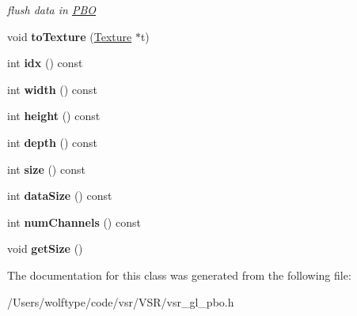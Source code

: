 \begin{DoxyCompactItemize}
\begin{DoxyCompactList}\small\item\em flush data in \hyperlink{classvsr_1_1_p_b_o}{P\-B\-O} \end{DoxyCompactList}\item 
\hypertarget{classvsr_1_1_p_b_o_abd69a277a2d301dcacc6cbb0c0659dec}{void {\bfseries to\-Texture} (\hyperlink{classvsr_1_1_texture}{Texture} $\ast$t)}\label{classvsr_1_1_p_b_o_abd69a277a2d301dcacc6cbb0c0659dec}

\item 
\hypertarget{classvsr_1_1_p_b_o_a6d42f70a135317adb009f9a588bc2adc}{int {\bfseries idx} () const }\label{classvsr_1_1_p_b_o_a6d42f70a135317adb009f9a588bc2adc}

\item 
\hypertarget{classvsr_1_1_p_b_o_a650cee1457e7591445f2acc35f8186e0}{int {\bfseries width} () const }\label{classvsr_1_1_p_b_o_a650cee1457e7591445f2acc35f8186e0}

\item 
\hypertarget{classvsr_1_1_p_b_o_ad3456b46511b43ca9aac8ab6e2a8f13e}{int {\bfseries height} () const }\label{classvsr_1_1_p_b_o_ad3456b46511b43ca9aac8ab6e2a8f13e}

\item 
\hypertarget{classvsr_1_1_p_b_o_a1f108aefbfe0309b219c5929901b83a3}{int {\bfseries depth} () const }\label{classvsr_1_1_p_b_o_a1f108aefbfe0309b219c5929901b83a3}

\item 
\hypertarget{classvsr_1_1_p_b_o_ad8ac523681f02fdf799148d3b9f1fa3a}{int {\bfseries size} () const }\label{classvsr_1_1_p_b_o_ad8ac523681f02fdf799148d3b9f1fa3a}

\item 
\hypertarget{classvsr_1_1_p_b_o_a459138da3ee6be14de775d5999805c9f}{int {\bfseries data\-Size} () const }\label{classvsr_1_1_p_b_o_a459138da3ee6be14de775d5999805c9f}

\item 
\hypertarget{classvsr_1_1_p_b_o_abca95db78e5f34ec9cd26f0bc352474d}{int {\bfseries num\-Channels} () const }\label{classvsr_1_1_p_b_o_abca95db78e5f34ec9cd26f0bc352474d}

\item 
\hypertarget{classvsr_1_1_p_b_o_a8cd3b11320bf712fcad3b154963ae680}{void {\bfseries get\-Size} ()}\label{classvsr_1_1_p_b_o_a8cd3b11320bf712fcad3b154963ae680}

\end{DoxyCompactItemize}


The documentation for this class was generated from the following file\-:\begin{DoxyCompactItemize}
\item 
/\-Users/wolftype/code/vsr/\-V\-S\-R/vsr\-\_\-gl\-\_\-pbo.\-h\end{DoxyCompactItemize}

